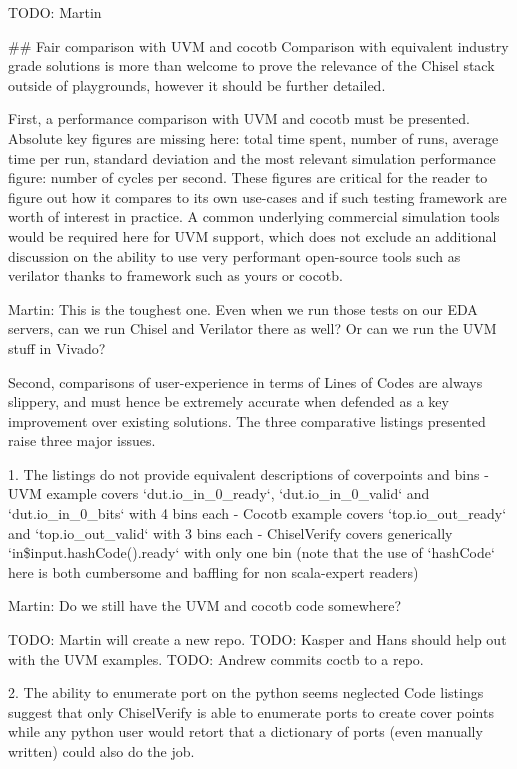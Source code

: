 \documentclass{article}
\newcommand{\todo}[1]{{\color{olive} TODO: #1}}
\newcommand{\martin}[1]{{\color{blue} Martin: #1\\}}
\begin{document}
\todo{Martin}


\#\# Fair comparison with UVM and cocotb
Comparison with equivalent industry grade solutions is more than welcome to prove the relevance of the Chisel stack outside of playgrounds, however it should be further detailed.

First, a performance comparison with UVM and cocotb must be presented.
Absolute key figures are missing here: total time spent, number of runs, average time per run, standard deviation and the most relevant simulation performance figure: number of cycles per second.
These figures are critical for the reader to figure out how it compares to its own use-cases and if such testing framework are worth of interest in practice.
A common underlying commercial simulation tools would be required here for UVM support, which does not exclude an additional discussion on the ability to use very performant open-source tools such as verilator thanks to framework such as yours or cocotb.

\martin{This is the toughest one. Even when we run those tests on our EDA servers, can we run
Chisel and Verilator there as well? Or can we run the UVM stuff in Vivado?}

Second, comparisons of user-experience in terms of Lines of Codes are always slippery, and must hence be extremely accurate when defended as a key improvement over existing solutions.
The three comparative listings presented raise three major issues.

1. The listings do not provide equivalent descriptions of coverpoints and bins
- UVM example covers `dut.io\_in\_0\_ready`, `dut.io\_in\_0\_valid` and `dut.io\_in\_0\_bits` with 4 bins each
- Cocotb example covers `top.io\_out\_ready` and `top.io\_out\_valid` with 3 bins each
- ChiselVerify covers generically `in\${input.hashCode()}.ready` with only one bin (note that the use of `hashCode` here is both cumbersome and baffling for non scala-expert readers)

\martin{Do we still have the UVM and cocotb code somewhere?}

\todo{Martin will create a new repo.}
\todo{Kasper and Hans should help out with the UVM examples.}
\todo{Andrew commits coctb to a repo.}

2. The ability to enumerate port on the python seems neglected
Code listings suggest that only ChiselVerify is able to enumerate ports to create cover points while any python user would retort that a dictionary of ports (even manually written) could also do the job.
\end{document}
